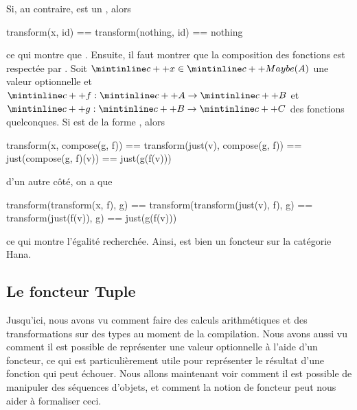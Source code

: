 Si, au contraire,  est un , alors
\begin{cpp}
    transform(x, id) == transform(nothing, id)
                     == nothing
\end{cpp}

ce qui montre que . Ensuite, il faut montrer
que la composition des fonctions est respectée par . Soit
$\cc{x} \in \cc{Maybe(A)}$ une valeur optionnelle et $\cc{f} : \cc{A} \to \cc{B}$
et $\cc{g} : \cc{B} \to \cc{C}$ des fonctions quelconques. Si  est de la
forme , alors
\begin{cpp}
    transform(x, compose(g, f)) == transform(just(v), compose(g, f))
                                == just(compose(g, f)(v))
                                == just(g(f(v)))
\end{cpp}

d'un autre côté, on a que
\begin{cpp}
    transform(transform(x, f), g) == transform(transform(just(v), f), g)
                                  == transform(just(f(v)), g)
                                  == just(g(f(v)))
\end{cpp}

ce qui montre l'égalité recherchée. Ainsi,  est bien un foncteur
sur la catégorie Hana.



\subsection{Le foncteur Tuple}
Jusqu'ici, nous avons vu comment faire des calculs arithmétiques et des
transformations sur des types au moment de la compilation. Nous avons aussi
vu comment il est possible de représenter une valeur optionnelle à l'aide d'un
foncteur, ce qui est particulièrement utile pour représenter le résultat
d'une fonction qui peut échouer. Nous allons maintenant voir comment il est
possible de manipuler des séquences d'objets, et comment la notion de foncteur
peut nous aider à formaliser ceci.

